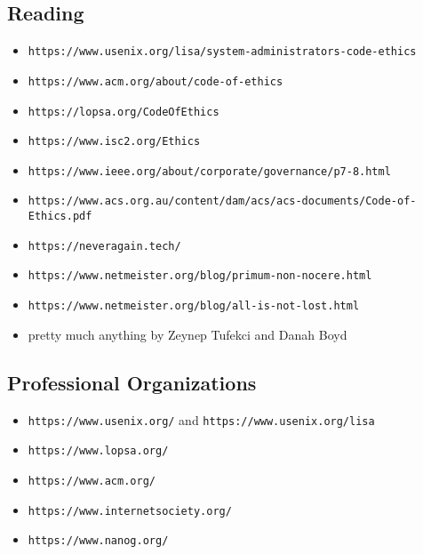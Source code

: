 \documentclass[xga]{xdvislides}
\begin{document}
\subsection{Reading}
\begin{itemize}
	\item \verb+https://www.usenix.org/lisa/system-administrators-code-ethics+
	\item \verb+https://www.acm.org/about/code-of-ethics+
	\item \verb+https://lopsa.org/CodeOfEthics+
	\item \verb+https://www.isc2.org/Ethics+
	\item \verb+https://www.ieee.org/about/corporate/governance/p7-8.html+
	\item \verb+https://www.acs.org.au/content/dam/acs/acs-documents/Code-of-Ethics.pdf+
	\item \verb+https://neveragain.tech/+
	\item \verb+https://www.netmeister.org/blog/primum-non-nocere.html+
	\item \verb+https://www.netmeister.org/blog/all-is-not-lost.html+
	\item pretty much anything by Zeynep Tufekci and Danah Boyd
\end{itemize}

\subsection{Professional Organizations}
\begin{itemize} \item \verb+https://www.usenix.org/+
and \verb+https://www.usenix.org/lisa+ \item
\verb+https://www.lopsa.org/+ \item
\verb+https://www.acm.org/+ \item
\verb+https://www.internetsociety.org/+ \item
\verb+https://www.nanog.org/+ \end{itemize}
\end{document}
